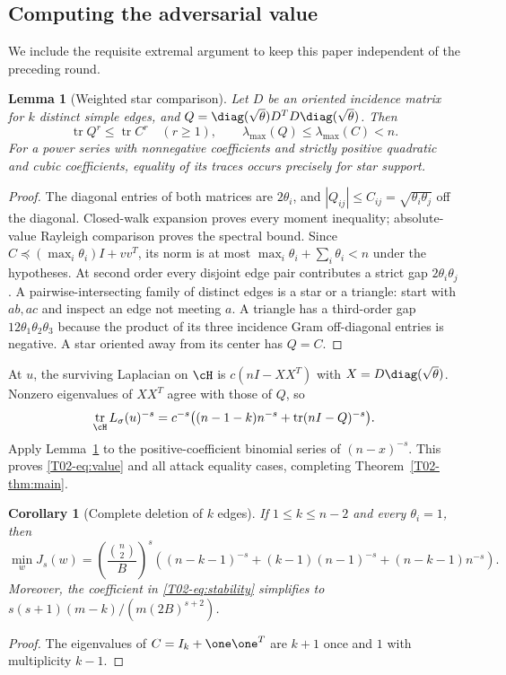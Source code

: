 \documentclass[11pt,a4paper]{article}
\newtheorem{lemma}[theorem]{Lemma}
\newtheorem{corollary}[theorem]{Corollary}
\theoremstyle{definition}\newtheorem{definition}[theorem]{Definition}
\theoremstyle{remark}\newtheorem{remark}[theorem]{Remark}
\DeclareMathOperator{\tr}{tr}\DeclareMathOperator{\supp}{supp}\DeclareMathOperator{\TV}{TV}
\numberwithin{equation}{section}
\begin{document}
\subsection{Computing the adversarial value}\label{T02-sec-4}
We include the requisite extremal argument to keep this paper independent of the preceding round.
\begin{lemma}[Weighted star comparison]\label{T02-lem:star}
Let $D$ be an oriented incidence matrix for $k$ distinct simple edges, and $Q=\diag(\sqrt{\theta})D^TD\diag(\sqrt{\theta})$. Then
\[
 \tr Q^r\le\tr C^r\quad(r\ge1),\qquad \lambda_{\max}(Q)\le\lambda_{\max}(C)<n.
\]
For a power series with nonnegative coefficients and strictly positive quadratic and cubic coefficients, equality of its traces occurs precisely for star support.
\end{lemma}
\begin{proof}
The diagonal entries of both matrices are $2\theta_i$, and $|Q_{ij}|\le C_{ij}=\sqrt{\theta_i\theta_j}$ off the diagonal. Closed-walk expansion proves every moment inequality; absolute-value Rayleigh comparison proves the spectral bound. Since $C\preceq(\max_i\theta_i)I+vv^T$, its norm is at most $\max_i\theta_i+\sum_i\theta_i<n$ under the hypotheses. At second order every disjoint edge pair contributes a strict gap $2\theta_i\theta_j$. A pairwise-intersecting family of distinct edges is a star or a triangle: start with $ab,ac$ and inspect an edge not meeting $a$. A triangle has a third-order gap $12\theta_1\theta_2\theta_3$ because the product of its three incidence Gram off-diagonal entries is negative. A star oriented away from its center has $Q=C$.
\end{proof}
At $u$, the surviving Laplacian on $\cH$ is $c(nI-XX^T)$ with $X=D\diag(\sqrt\theta)$. Nonzero eigenvalues of $XX^T$ agree with those of $Q$, so
\[
 \tr_{\cH}L_\sigma(u)^{-s}
 =c^{-s}\big((n-1-k)n^{-s}+\tr(nI-Q)^{-s}\big).
\]
Apply Lemma~\ref{T02-lem:star} to the positive-coefficient binomial series of $(n-x)^{-s}$. This proves \eqref{T02-eq:value} and all attack equality cases, completing Theorem~\ref{T02-thm:main}.

\begin{corollary}[Complete deletion of $k$ edges]
If $1\le k\le n-2$ and every $\theta_i=1$, then
\[
 \min_wJ_s(w)=\left(\frac{\binom n2}{B}\right)^s
 \left((n-k-1)^{-s}+(k-1)(n-1)^{-s}+(n-k-1)n^{-s}\right).
\]
Moreover, the coefficient in \eqref{T02-eq:stability} simplifies to
$s(s+1)(m-k)/(m(2B)^{s+2})$.
\end{corollary}
\begin{proof}
The eigenvalues of $C=I_k+\one\one^T$ are $k+1$ once and $1$ with multiplicity $k-1$.
\end{proof}
\end{document}
